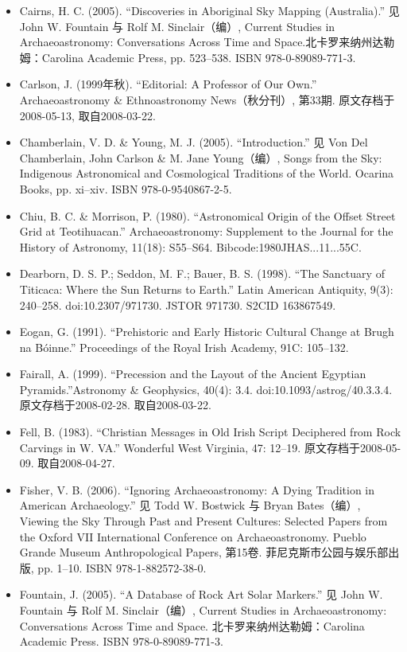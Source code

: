 \begin{itemize}
    \item Cairns, H. C. (2005). “Discoveries in Aboriginal Sky Mapping (Australia).” 见 John W. Fountain 与 Rolf M. Sinclair（编）, Current Studies in Archaeoastronomy: Conversations Across Time and Space.北卡罗来纳州达勒姆：Carolina Academic Press, pp. 523–538. ISBN 978-0-89089-771-3.
    \item Carlson, J. (1999年秋). “Editorial: A Professor of Our Own.” Archaeoastronomy \& Ethnoastronomy News（秋分刊）, 第33期. 原文存档于2008-05-13, 取自2008-03-22.
    \item Chamberlain, V. D. \& Young, M. J. (2005). “Introduction.” 见 Von Del Chamberlain, John Carlson \& M. Jane Young（编）, Songs from the Sky: Indigenous Astronomical and Cosmological Traditions of the World. Ocarina Books, pp. xi–xiv. ISBN 978-0-9540867-2-5.
    \item Chiu, B. C. \& Morrison, P. (1980). “Astronomical Origin of the Offset Street Grid at Teotihuacan.” Archaeoastronomy: Supplement to the Journal for the History of Astronomy, 11(18): S55–S64. Bibcode:1980JHAS...11...55C.
    \item Dearborn, D. S. P.; Seddon, M. F.; Bauer, B. S. (1998). “The Sanctuary of Titicaca: Where the Sun Returns to Earth.” Latin American Antiquity, 9(3): 240–258. doi:10.2307/971730. JSTOR 971730. S2CID 163867549.
    \item Eogan, G. (1991). “Prehistoric and Early Historic Cultural Change at Brugh na Bóinne.” Proceedings of the Royal Irish Academy, 91C: 105–132.
    \item Fairall, A. (1999). “Precession and the Layout of the Ancient Egyptian Pyramids.”Astronomy \& Geophysics, 40(4): 3.4. doi:10.1093/astrog/40.3.3.4. 原文存档于2008-02-28. 取自2008-03-22.
    \item Fell, B. (1983). “Christian Messages in Old Irish Script Deciphered from Rock Carvings in W. VA.” Wonderful West Virginia, 47: 12–19. 原文存档于2008-05-09. 取自2008-04-27.
    \item Fisher, V. B. (2006). “Ignoring Archaeoastronomy: A Dying Tradition in American Archaeology.” 见 Todd W. Bostwick 与 Bryan Bates（编）, Viewing the Sky Through Past and Present Cultures: Selected Papers from the Oxford VII International Conference on Archaeoastronomy. Pueblo Grande Museum Anthropological Papers, 第15卷. 菲尼克斯市公园与娱乐部出版, pp. 1–10. ISBN 978-1-882572-38-0.
    \item Fountain, J. (2005). “A Database of Rock Art Solar Markers.” 见 John W. Fountain 与 Rolf M. Sinclair（编）, Current Studies in Archaeoastronomy: Conversations Across Time and Space. 北卡罗来纳州达勒姆：Carolina Academic Press. ISBN 978-0-89089-771-3.

\end{itemize}
